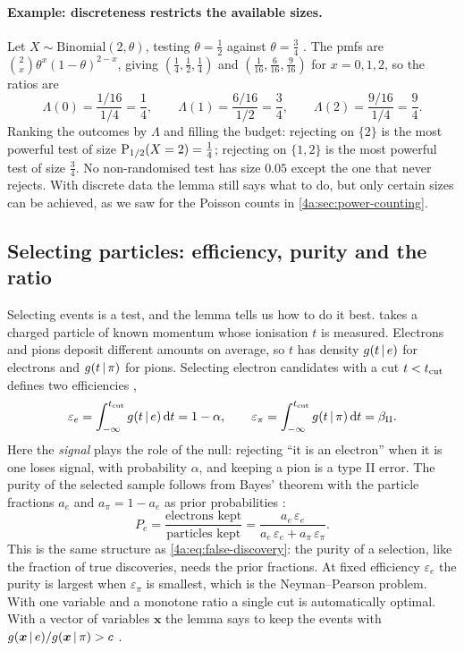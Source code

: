 \paragraph{Example: discreteness restricts the available sizes.}
Let $X\sim\mathrm{Binomial}(2,\theta)$, testing $\theta=\frac12$ against
$\theta=\frac34$ . The pmfs are
$\binom2x\theta^x(1-\theta)^{2-x}$, giving
$(\frac14,\frac12,\frac14)$ and $(\frac1{16},\frac6{16},\frac9{16})$ for
$x=0,1,2$, so the ratios are
\[
  \Lambda(0)=\frac{1/16}{1/4}=\frac14,\qquad
  \Lambda(1)=\frac{6/16}{1/2}=\frac34,\qquad
  \Lambda(2)=\frac{9/16}{1/4}=\frac94 .
\]
Ranking the outcomes by $\Lambda$ and filling the budget: rejecting on
$\{2\}$ is the most powerful test of size $\operatorname{P}_{1/2}(X=2)=\frac14$; rejecting
on $\{1,2\}$ is the most powerful test of size $\frac34$. No non-randomised
test has size $0.05$ except the one that never rejects. With discrete data the
lemma still says what to do, but only certain sizes can be achieved, as we saw
for the Poisson counts in \cref{4a:sec:power-counting}.

\subsection{Selecting particles: efficiency, purity and the ratio}
\label{4a:sec:selection}

Selecting events is a test, and the lemma tells us how to do it best.
 takes a charged
particle of known momentum whose ionisation $t$ is measured. Electrons and
pions deposit different amounts on average, so $t$ has density $g(t\,\vert\, e)$
for electrons and $g(t\,\vert\,\pi)$ for pions. Selecting electron candidates with
a cut $t<t_{\rm cut}$ defines two efficiencies ,
\[
  \varepsilon_e=\int_{-\infty}^{t_{\rm cut}}g(t\,\vert\, e)\,\mathrm{d} t=1-\alpha,
  \qquad
  \varepsilon_\pi=\int_{-\infty}^{t_{\rm cut}}g(t\,\vert\,\pi)\,\mathrm{d} t=\beta_{\rm II} .
\]
Here the \emph{signal} plays the role of the null: rejecting ``it is an
electron'' when it is one loses signal, with probability $\alpha$, and keeping
a pion is a type II error. The purity of the selected sample follows from
Bayes' theorem with the particle fractions $a_e$ and $a_\pi=1-a_e$ as prior
probabilities :
\begin{equation}
  P_e=\frac{\text{electrons kept}}{\text{particles kept}}
  =\frac{a_e\,\varepsilon_e}{a_e\,\varepsilon_e+a_\pi\,\varepsilon_\pi} .
  \label{4a:eq:purity}
\end{equation}
This is the same structure as \eqref{4a:eq:false-discovery}: the purity of a
selection, like the fraction of true discoveries, needs the prior fractions.
At fixed efficiency $\varepsilon_e$ the purity is largest when
$\varepsilon_\pi$ is smallest, which is the Neyman--Pearson problem. With one
variable and a monotone ratio a single cut is automatically optimal. With a
vector of variables $\bm x$ the lemma says to keep the events with
$g(\bm x\,\vert\, e)/g(\bm x\,\vert\,\pi)>c$ .

